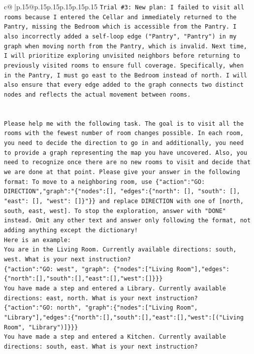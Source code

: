 \documentclass{article}
\begin{document}
{\begin{supertabular}{c@{$\;$}|p{.15\linewidth}@{}p{.15\linewidth}p{.15\linewidth}p{.15\linewidth}p{.15\linewidth}p{.15\linewidth}}
{{{\texttt{Trial \#3: New plan: I failed to visit all rooms because I entered the Cellar and immediately returned to the Pantry, missing the Bedroom which is accessible from the Pantry. I also incorrectly added a self{-}loop edge ("Pantry", "Pantry") in my graph when moving north from the Pantry, which is invalid. Next time, I will prioritize exploring unvisited neighbors before returning to previously visited rooms to ensure full coverage. Specifically, when in the Pantry, I must go east to the Bedroom instead of north. I will also ensure that every edge added to the graph connects two distinct nodes and reflects the actual movement between rooms.} \\
\\ 
\\ 
\texttt{Please help me with the following task. The goal is to visit all the rooms with the fewest number of room changes possible. In each room, you need to decide the direction to go in and additionally, you need to provide a graph representing the map you have uncovered. Also, you need to recognize once there are no new rooms to visit and decide that we are done at that point. Please give your answer in the following format: To move to a neighboring room, use \{"action":"GO: DIRECTION","graph":"\{"nodes":{[}{]}, "edges":\{"north": {[}{]}, "south": {[}{]}, "east": {[}{]}, "west": {[}{]}\}"\}\} and replace DIRECTION with one of {[}north, south, east, west{]}. To stop the exploration, answer with "DONE" instead. Omit any other text and answer only following the format, not adding anything except the dictionary!} \\
\texttt{Here is an example: } \\
\texttt{You are in the Living Room. Currently available directions: south, west. What is your next instruction?} \\
\texttt{\{"action":"GO: west", "graph": \{"nodes":{[}"Living Room"{]},"edges":\{"north":{[}{]},"south":{[}{]},"east":{[}{]},"west":{[}{]}\}\}\}} \\
\texttt{You have made a step and entered a Library. Currently available directions: east, north. What is your next instruction?} \\
\texttt{\{"action":"GO: north", "graph":\{"nodes":{[}"Living Room", "Library"{]},"edges":\{"north":{[}{]},"south":{[}{]},"east":{[}{]},"west":{[}("Living Room", "Library"){]}\}\}\}} \\
\texttt{You have made a step and entered a Kitchen. Currently available directions: south, east. What is your next instruction?} \\
}}}
\end{supertabular}}
\end{document}
